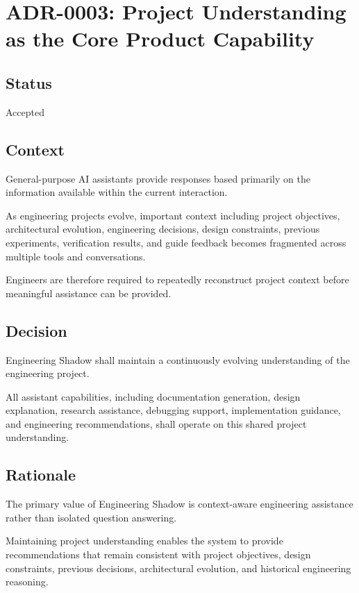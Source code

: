 \section{ADR-0003: Project Understanding as the Core Product Capability}

\subsection*{Status}

Accepted

\subsection*{Context}

General-purpose AI assistants provide responses based primarily on the information available within the current interaction.

As engineering projects evolve, important context including project objectives, architectural evolution, engineering decisions, design constraints, previous experiments, verification results, and guide feedback becomes fragmented across multiple tools and conversations.

Engineers are therefore required to repeatedly reconstruct project context before meaningful assistance can be provided.

\subsection*{Decision}

Engineering Shadow shall maintain a continuously evolving understanding of the engineering project.

All assistant capabilities, including documentation generation, design explanation, research assistance, debugging support, implementation guidance, and engineering recommendations, shall operate on this shared project understanding.

\subsection*{Rationale}

The primary value of Engineering Shadow is context-aware engineering assistance rather than isolated question answering.

Maintaining project understanding enables the system to provide recommendations that remain consistent with project objectives, design constraints, previous decisions, architectural evolution, and historical engineering reasoning.


